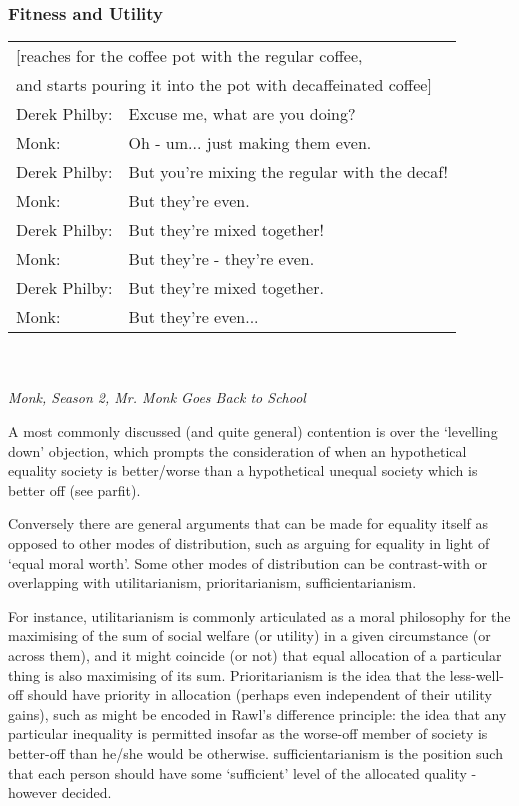 \subsubsection{Fitness and Utility}

\begin{displayquote}
\begin{tabular}{ll}
\multicolumn{2}{l}{[reaches for the coffee pot with the regular coffee,} \\
\multicolumn{2}{l}{\-\hspace{5mm}and starts pouring it into the pot with decaffeinated coffee]} \\
Derek Philby:  & Excuse me, what are you doing?\\
Monk:  & Oh - um... just making them even.\\
Derek Philby:  & But you're mixing the regular with the decaf!\\
Monk:  & But they're even.\\
Derek Philby:  & But they're mixed together!\\
Monk:  & But they're - they're even.\\
Derek Philby:  & But they're mixed together.\\
Monk:  & But they're even...\\
\end{tabular}\\
\vspace{-0.5mm}\\
\null\hfill\textit{Monk, Season 2, Mr. Monk Goes Back to School}
\end{displayquote}

A most commonly discussed (and quite general) contention is over the `levelling down' objection, which prompts the consideration of when an hypothetical equality society is better/worse than a hypothetical unequal society which is better off (see parfit).

Conversely there are general arguments that can be made for equality itself as opposed to other modes of distribution, such as arguing for equality in light of `equal moral worth'.
Some other modes of distribution can be contrast-with or overlapping with utilitarianism, prioritarianism, sufficientarianism.

For instance, utilitarianism is commonly articulated as a moral philosophy for the maximising of the sum of social welfare (or utility) in a given circumstance (or across them), and it might coincide (or not) that equal allocation of a particular thing is also maximising of its sum.
Prioritarianism is the idea that the less-well-off should have priority in allocation (perhaps even independent of their utility gains), such as might be encoded in Rawl's difference principle: the idea that any particular inequality is permitted insofar as the worse-off member of society is better-off than he/she would be otherwise.
sufficientarianism is the position such that each person should have some `sufficient' level of the allocated quality - however decided.

